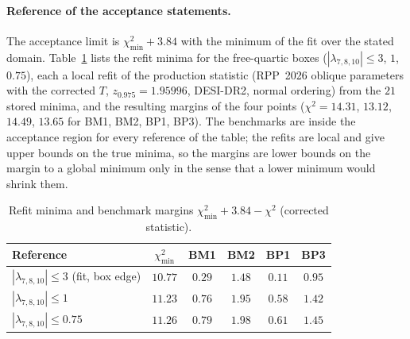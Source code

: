 \documentclass[twocolumn,epjc3]{svjour3}
\begin{document}
\paragraph{Reference of the acceptance statements.} The acceptance limit is $\chi^2_{\min}+3.84$ with the minimum of the fit over the stated domain. Table~\ref{tab:ref} lists the refit minima for the free-quartic boxes ($|\lambda_{7,8,10}|\le3$, $1$, $0.75$), each a local refit of the production statistic (RPP~2026 oblique parameters with the corrected $T$, $z_{0.975}=1.95996$, DESI-DR2, normal ordering) from the $21$ stored minima, and the resulting margins of the four points ($\chi^2=14.31$, $13.12$, $14.49$, $13.65$ for BM1, BM2, BP1, BP3). The benchmarks are inside the acceptance region for every reference of the table; the refits are local and give upper bounds on the true minima, so the margins are lower bounds on the margin to a global minimum only in the sense that a lower minimum would shrink them.
\begin{table}[t]
\centering
\caption{Refit minima and benchmark margins $\chi^2_{\min}+3.84-\chi^2$ (corrected statistic).}\label{tab:ref}
\begin{tabular}{lccccc}
\hline
Reference & $\chi^2_{\min}$ & BM1 & BM2 & BP1 & BP3\\
\hline
$|\lambda_{7,8,10}|\le3$ (fit, box edge) & $10.77$ & $0.29$ & $1.48$ & $0.11$ & $0.95$\\
$|\lambda_{7,8,10}|\le1$ & $11.23$ & $0.76$ & $1.95$ & $0.58$ & $1.42$\\
$|\lambda_{7,8,10}|\le0.75$ & $11.26$ & $0.79$ & $1.98$ & $0.61$ & $1.45$\\
\hline
\end{tabular}
\end{table}
\end{document}
